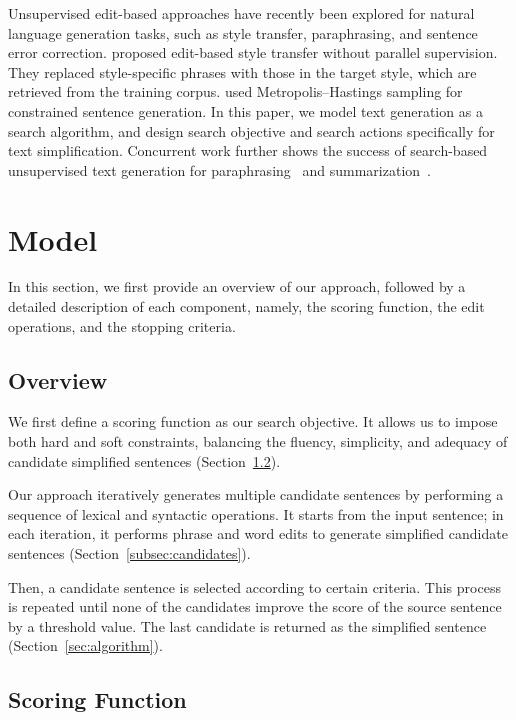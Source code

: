 \documentclass[11pt,a4paper]{article}
\begin{document}
Unsupervised edit-based approaches have recently been explored for natural language generation tasks, such as style transfer, paraphrasing, and sentence error correction.
 proposed edit-based  style transfer without parallel supervision. They replaced style-specific phrases with those in the target style, which are retrieved from the training corpus. 
 used Metropolis--Hastings sampling for constrained sentence generation. In this paper, we model text generation as a search algorithm, and design search objective and search actions specifically for text simplification. Concurrent work further shows the success of search-based unsupervised text generation for paraphrasing~\cite{UPSA} and summarization~\cite{HC}. 



\section{Model}

In this section, we first provide an overview of our approach, followed by a detailed description of each component, namely, the scoring function, the edit operations, and the stopping criteria. 

\subsection{Overview}

We first define a scoring function as our search objective. It allows us to impose both hard and soft constraints, balancing the fluency, simplicity, and adequacy of candidate simplified sentences  (Section~\ref{ss:objective}).

Our approach iteratively generates multiple candidate sentences by performing a sequence of lexical and syntactic operations. It starts from the input sentence; in each iteration, it performs phrase and word edits to generate simplified candidate sentences (Section~\ref{subsec:candidates}). 

Then, a candidate sentence is selected according to certain criteria. This process is repeated until none of the candidates improve the score of the source sentence by a threshold value. The last candidate is returned as the simplified sentence (Section~\ref{sec:algorithm}).



\subsection{Scoring Function}
\label{ss:objective}
\end{document}
